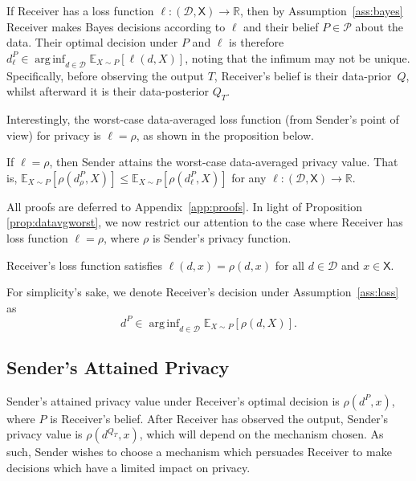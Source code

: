 \documentclass{article}
\theoremstyle{plain}
\theoremstyle{plain}
\theoremstyle{definition}
\theoremstyle{remark}
\theoremstyle{plain}
\newcommand{\xtrue}{x}
\newcommand{\stat}{T}
\DeclareMathOperator*{\arginf}{arg\,inf}
\newcommand{\xset}{\mathsf{X}}
\newcommand{\dset}{\mathcal{D}}
\begin{document}
If Receiver has a loss  function $\ell: (\dset, \xset) \rightarrow \mathbb{R}$, then by Assumption~\ref{ass:bayes} Receiver makes Bayes decisions according to $\ell$ and their belief $P \in \mathcal{P}$ about the data. Their optimal decision under $P$ and $\ell$ is therefore
$d^{P}_\ell \in \arginf_{d \in \dset} \mathbb{E}_{X \sim P}[ \ell(d,X)]$,
noting that the infimum may not be unique. Specifically, before observing the output $T$, Receiver's belief is their data-prior~$Q$, whilst afterward it is their data-posterior $Q_{\stat}$.

Interestingly, the worst-case data-averaged loss function (from Sender's point of view) for privacy is $\ell = \rho$, as shown in the proposition below. 
\begin{proposition}\label{prop:datavgworst}
 If $\ell = \rho$, then Sender attains the worst-case data-averaged privacy value. That is, $\mathbb{E}_{X \sim P}[ \rho(d^P_\rho,X)] \leq \mathbb{E}_{X \sim P}[ \rho(d^P_\ell,X)]$ for any $\ell: (\dset, \xset) \rightarrow \mathbb{R}$.
 
\end{proposition}

All proofs are deferred to Appendix~\ref{app:proofs}.
In light of Proposition \ref{prop:datavgworst}, we now restrict our attention to the case where Receiver has loss function $\ell = \rho$, where $\rho$ is Sender's privacy function. 
\begin{assumption}\label{ass:loss}
    Receiver's loss function satisfies $\ell(d,x) = \rho(d,x)$ for all $d \in \dset$ and $x\in\xset$.
\end{assumption}
For simplicity's sake, we denote Receiver's decision under Assumption~\ref{ass:loss} as 
\begin{equation}\label{eq:advoptdec}
    d^{P} \in \arginf_{d \in \dset} \mathbb{E}_{X \sim P}[ \rho(d,X)].
\end{equation}

\subsection{Sender's Attained Privacy}

Sender's attained privacy value under Receiver's optimal decision is $\rho(d^{P},\xtrue)$, where $P$ is Receiver's belief. After Receiver has observed the output, Sender's privacy value is $\rho(d^{Q_T},\xtrue)$, which will depend on the mechanism chosen. As such, Sender wishes to choose a mechanism which persuades Receiver to make decisions which have a limited impact on privacy. 
\end{document}
